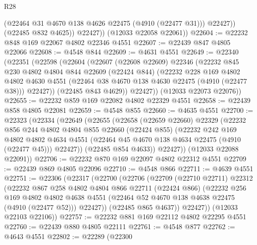 \begin{lexlean}{R28}
\begin{coremodule}
                (@22464 @31 @4670 @138 @4626 @22475 (@4910 (@22477 @31)))
                @22427))
            (@22485 @832 @4625))
          @22427))
      (@12033 @22058 @22061))
@22604 := @22232 @848 @169 @22067 @4802 @22346 @4551
@22607 := @22439 @847 @4805 @22066
@22608 := @4548 @844
@22609 := @4631 @4551
@22649 := @22340
    (@22351
      (@22598
        (@22604
          (@22607
            (@22608 @22609)
            @22346
            (@22232
              @845
              @230
              @4802
              @4804
              @844
              @22609
              (@22424 @844)
              (@22232
                @228
                @169
                @4802
                @4802
                @4630
                @4551
                (@22464 @38 @4670 @138 @4630 @22475 (@4910 (@22477 @38)))
                @22427))
            (@22485 @843 @4629))
          @22427))
      (@12033 @22073 @22076))
@22655 := @22232 @859 @169 @22082 @4802 @22329 @4551
@22658 := @22439 @858 @4805 @22081
@22659 := @4548 @855
@22660 := @4635 @4551
@22700 := @22323
    (@22334
      (@22649
        (@22655
          (@22658
            (@22659 @22660)
            @22329
            (@22232
              @856
              @244
              @4802
              @4804
              @855
              @22660
              (@22424 @855)
              (@22232
                @242
                @169
                @4802
                @4802
                @4634
                @4551
                (@22464 @45 @4670 @138 @4634 @22475 (@4910 (@22477 @45)))
                @22427))
            (@22485 @854 @4633))
          @22427))
      (@12033 @22088 @22091))
@22706 := @22232 @870 @169 @22097 @4802 @22312 @4551
@22709 := @22439 @869 @4805 @22096
@22710 := @4548 @866
@22711 := @4639 @4551
@22751 := @22306
    (@22317
      (@22700
        (@22706
          (@22709
            (@22710 @22711)
            @22312
            (@22232
              @867
              @258
              @4802
              @4804
              @866
              @22711
              (@22424 @866)
              (@22232
                @256
                @169
                @4802
                @4802
                @4638
                @4551
                (@22464 @52 @4670 @138 @4638 @22475 (@4910 (@22477 @52)))
                @22427))
            (@22485 @865 @4637))
          @22427))
      (@12033 @22103 @22106))
@22757 := @22232 @881 @169 @22112 @4802 @22295 @4551
@22760 := @22439 @880 @4805 @22111
@22761 := @4548 @877
@22762 := @4643 @4551
@22802 := @22289
    (@22300

\end{coremodule}
\end{lexlean}
